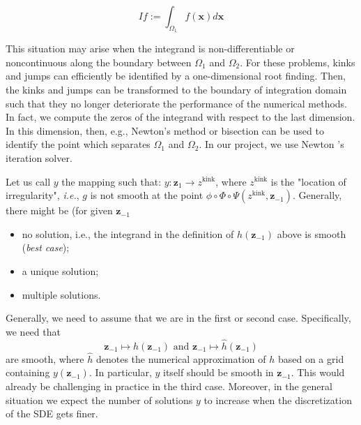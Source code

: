 \documentclass[11pt]{article}
\newcommand{\ie}{\emph{i.e.}}
\begin{document}
\begin{equation}
I f := \int_{\Omega_1} f(\mathbf{x}) d \mathbf{x}
\end{equation}

This situation may arise when the integrand is non-differentiable or noncontinuous along the boundary between $\Omega_1$ and $\Omega_2$. For these problems, kinks and jumps can efficiently be identified by a one-dimensional root finding. Then, the kinks and jumps can
be transformed to the boundary of integration domain such that they no longer deteriorate the performance of the numerical methods. In fact, we  compute the zeros of the integrand  with respect to  the last dimension. In this dimension, then, e.g., Newton's method or bisection can be used to identify the point which separates $\Omega_1$ and $\Omega_2$. In our project, we use Newton 's iteration solver.


Let us call $y$ the mapping such that: $y: \mathbf{z}_1 \rightarrow z^{\text{kink}}$, where  $z^{\text{kink}}$ is   the "location of
irregularity", \ie,  $g$ is not smooth at the point $\phi \circ \Phi \circ \Psi(z^{\text{kink}}, \mathbf{z}_{-1})$. Generally, there might be (for given $\mathbf{z}_{-1}$
\begin{itemize}
	\item no solution, i.e., the integrand in the definition of $h(\mathbf{z}_{-1})$ above
	is smooth (\textit{best case});
	\item a unique solution;
	\item multiple solutions.
\end{itemize}

Generally, we need to assume that we are in the first or second
case. Specifically, we need that
\begin{equation*}
	\mathbf{z}_{-1} \mapsto h(\mathbf{z}_{-1}) \text{ and } \mathbf{z}_{-1} \mapsto \hat{h}(\mathbf{z}_{-1})
\end{equation*}
are smooth, where $\hat{h}$ denotes the numerical approximation of $h$ based
on a grid containing $y(\mathbf{z}_{-1})$. In particular, $y$ itself should be smooth
in $\mathbf{z}_{-1}$. This would already be challenging in practice in the third
case. Moreover, in the general situation we expect the number of solutions $y$
to increase when the discretization of the SDE gets finer.
\end{document}
